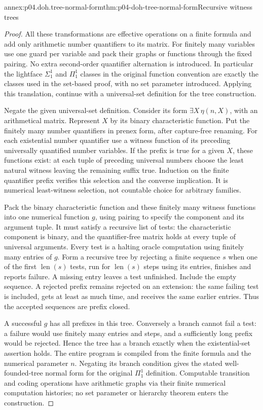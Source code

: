 \begin{annexitem}{annex:p04.doh.tree-normal-form}{thm:p04-doh-tree-normal-form}{Recursive witness trees}
\begin{proof}
All these transformations are effective operations on a finite formula
and add only arithmetic number quantifiers to its matrix. For finitely
many variables use one guard per variable and pack their graphs or
functions through the fixed pairing. No extra second-order quantifier
alternation is introduced. In particular the lightface \(\Sigma^1_1\)
and \(\Pi^1_1\) classes in the original function convention are
exactly the classes used in the set-based proof, with no set parameter
introduced. Applying this translation, continue with a universal-set
definition for the tree construction.

Negate the given universal-set definition. Consider its form
\(\exists X\,\eta(n,X)\), with an arithmetical matrix. Represent
\(X\) by its binary characteristic function. Put the finitely
many number quantifiers in prenex form, after capture-free renaming.
For each existential number quantifier use a witness function of its
preceding universally quantified number variables. If the prefix is
true for a given \(X\), these functions exist: at each tuple of
preceding universal numbers choose the least natural witness leaving
the remaining suffix true. Induction on the finite quantifier prefix
verifies this selection and the converse implication. It is numerical
least-witness selection, not countable choice for arbitrary families.

Pack the binary characteristic function and these finitely many witness
functions into one numerical function \(g\), using pairing to specify
the component and its argument tuple. It must satisfy a recursive
list of tests: the characteristic component is binary, and the
quantifier-free matrix holds at every tuple of universal arguments.
Every test is a halting oracle computation using finitely many entries
of \(g\). Form a recursive tree by rejecting a finite sequence
\(s\) when one of the first \(\operatorname{len}(s)\) tests,
run for \(\operatorname{len}(s)\) steps using its entries, finishes
and reports failure. A missing entry leaves a test unfinished.
Include the empty sequence. A rejected prefix remains rejected on
an extension: the same failing test is included, gets at least as
much time, and receives the same earlier entries. Thus the accepted
sequences are prefix closed.

A successful \(g\) has all prefixes in this tree. Conversely a
branch cannot fail a test: a failure would use finitely many entries
and steps, and a sufficiently long prefix would be rejected. Hence
the tree has a branch exactly when the existential-set assertion
holds. The entire program is compiled from the finite formula and
the numerical parameter \(n\). Negating its branch condition
gives the stated well-founded-tree normal form for the original
\(\Pi^1_1\) definition. Computable transition and coding operations
have arithmetic graphs via their finite numerical computation histories;
no set parameter or hierarchy theorem enters the construction.
\end{proof}
\end{annexitem}


